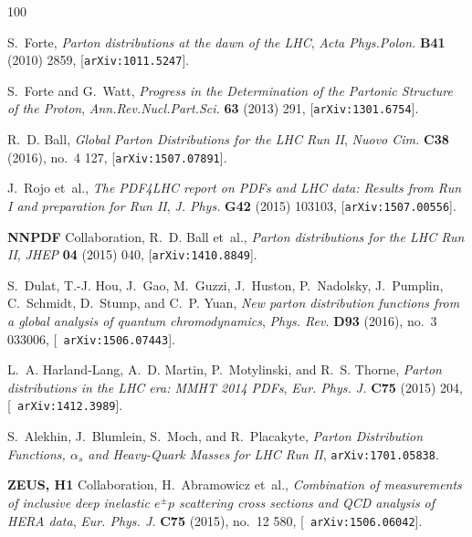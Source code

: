 \newpage
\providecommand{\href}[2]{#2}\begingroup\raggedright\begin{thebibliography}{100}

S.~Forte, {\it {Parton distributions at the dawn of the LHC}},  {\em Acta
  Phys.Polon.} {\bf B41} (2010) 2859,
  [\href{http://arxiv.org/abs/1011.5247}{{\tt arXiv:1011.5247}}].

S.~Forte and G.~Watt, {\it {Progress in the Determination of the Partonic
  Structure of the Proton}},  {\em Ann.Rev.Nucl.Part.Sci.} {\bf 63} (2013) 291,
  [\href{http://arxiv.org/abs/1301.6754}{{\tt arXiv:1301.6754}}].

R.~D. Ball, {\it {Global Parton Distributions for the LHC Run II}},  {\em Nuovo
  Cim.} {\bf C38} (2016), no.~4 127,
  [\href{http://arxiv.org/abs/1507.07891}{{\tt arXiv:1507.07891}}].

J.~Rojo et~al., {\it {The PDF4LHC report on PDFs and LHC data: Results from Run
  I and preparation for Run II}},  {\em J. Phys.} {\bf G42} (2015) 103103,
  [\href{http://arxiv.org/abs/1507.00556}{{\tt arXiv:1507.00556}}].

{\bf NNPDF} Collaboration, R.~D. Ball et~al., {\it {Parton distributions for
  the LHC Run II}},  {\em JHEP} {\bf 04} (2015) 040,
  [\href{http://arxiv.org/abs/1410.8849}{{\tt arXiv:1410.8849}}].

S.~Dulat, T.-J. Hou, J.~Gao, M.~Guzzi, J.~Huston, P.~Nadolsky, J.~Pumplin,
  C.~Schmidt, D.~Stump, and C.~P. Yuan, {\it {New parton distribution functions
  from a global analysis of quantum chromodynamics}},  {\em Phys. Rev.} {\bf
  D93} (2016), no.~3 033006, [\href{http://arxiv.org/abs/1506.07443}{{\tt
  arXiv:1506.07443}}].

L.~A. Harland-Lang, A.~D. Martin, P.~Motylinski, and R.~S. Thorne, {\it {Parton
  distributions in the LHC era: MMHT 2014 PDFs}},  {\em Eur. Phys. J.} {\bf
  C75} (2015) 204, [\href{http://arxiv.org/abs/1412.3989}{{\tt
  arXiv:1412.3989}}].

S.~Alekhin, J.~Blumlein, S.~Moch, and R.~Placakyte, {\it {Parton Distribution
  Functions, $\alpha_s$ and Heavy-Quark Masses for LHC Run II}},
  \href{http://arxiv.org/abs/1701.05838}{{\tt arXiv:1701.05838}}.

{\bf ZEUS, H1} Collaboration, H.~Abramowicz et~al., {\it {Combination of
  measurements of inclusive deep inelastic ${e^{\pm }p}$ scattering cross
  sections and QCD analysis of HERA data}},  {\em Eur. Phys. J.} {\bf C75}
  (2015), no.~12 580, [\href{http://arxiv.org/abs/1506.06042}{{\tt
  arXiv:1506.06042}}].


\end{thebibliography}
